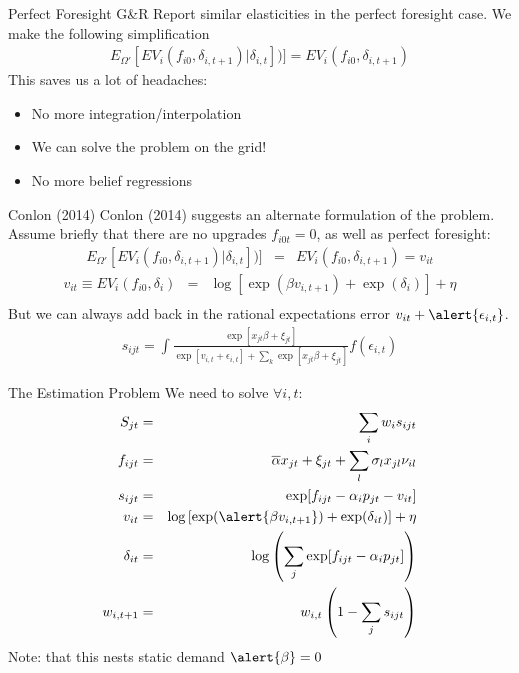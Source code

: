 \begin{frame}{Perfect Foresight}
G\&R Report similar elasticities in the perfect foresight case. We make the following simplification
\begin{eqnarray*}
E_{\Omega'}[ EV_i (f_{i0}, \delta_{i,t+1}) |\delta_{i,t}] )] = EV_i (f_{i0}, \delta_{i,t+1})
\end{eqnarray*}
This saves us a lot of headaches:
\begin{itemize}
\item No more integration/interpolation
\item We can solve the problem on the grid!
\item No more belief regressions
\end{itemize}
\end{frame}

\begin{frame}{Conlon (2014)}
Conlon (2014) suggests an alternate formulation of the problem.\\
\vspace{0.25cm}
Assume briefly that there are no upgrades $f_{i0t} = 0$, as well as perfect foresight:
\begin{eqnarray*}
E_{\Omega'}[ EV_i (f_{i0}, \delta_{i,t+1}) |\delta_{i,t}] )] &=& EV_i (f_{i0}, \delta_{i,t+1})  = v_{it} 
\end{eqnarray*}
\begin{eqnarray*}
 v_{it} \equiv EV_i(f_{i0}, \delta_i) &=& \log\left[ \exp( \beta v_{i,t+1})+ \exp(\delta_i)  \right] + \eta \\
\end{eqnarray*}
But we can always add back in the rational expectations error $v_{it} + \alert{\epsilon_{i,t}}$.
\begin{eqnarray*}
s_{ijt} = \int \frac{\exp[x_{jt}\beta + \xi_{jt} ]}{\exp[v_{i,t} + \epsilon_{i,t}] + \sum_k \exp[x_{jt}\beta + \xi_{jt} ]} f(\epsilon_{i,t})
\end{eqnarray*}

\end{frame}

\begin{frame}{The Estimation Problem}
We need to solve $\forall i, t $:
\begin{eqnarray*}
S_{jt}&=& \sum_i w_i s_{ijt}\\
f_{ijt} &=& \overline{\alpha} x_{jt} + \xi_{jt} + \sum_l \sigma_l x_{jl} \nu_{il} \\
s_{ijt} &=& \exp[f_{ijt} - \alpha_i p_{jt} - v_{it} ]\\
v_{it} &=& \log\left[ \exp( \alert{\beta v_{i,t+1}} )+ \exp(\delta_{it})  \right] + \eta\\
\delta_{it}&=& \log \left( \sum_j \exp[ f_{ijt}  -\alpha_i p_{jt} ]  \right)\\
w_{i,t+1} &=& w_{i,t} \left(1-\sum_j s_{ijt} \right)\\
\end{eqnarray*}
Note: that this nests static demand $\alert{\beta} = 0$
\end{frame}

